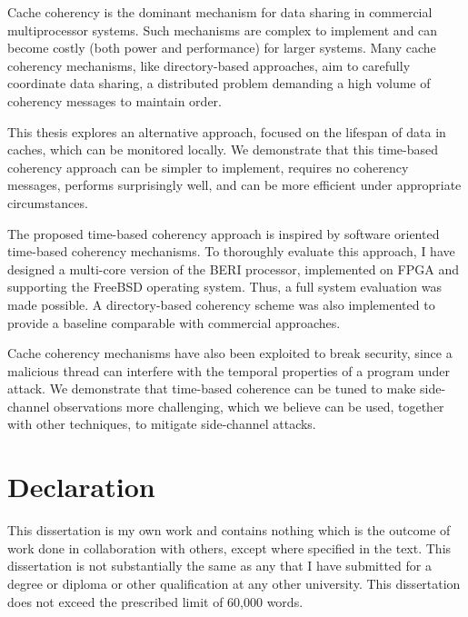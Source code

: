 \documentclass[twoside,openright,12pt]{Classes/CUEDthesisPSnPDF}
\begin{document}
\patchcmd{\abstract}{\null\vfil}{}{}{}
\begin{abstractseparate}
Cache coherency is the dominant mechanism for data sharing in commercial multiprocessor systems. Such mechanisms are complex to implement and can become costly (both power and performance) for larger systems.  Many cache coherency mechanisms, like directory-based approaches, aim to carefully coordinate data sharing, a distributed problem demanding a high volume of coherency messages to maintain order. 

This thesis explores an alternative approach, focused on the lifespan of data in caches, which can be monitored locally.  We demonstrate that this time-based coherency approach can be simpler to implement, requires no coherency messages, performs surprisingly well, and can be more efficient under appropriate circumstances.

The proposed time-based coherency approach is inspired by software oriented time-based coherency mechanisms. %
To thoroughly evaluate this approach, I have designed a multi-core version of the BERI processor, implemented on FPGA and supporting the FreeBSD operating system. Thus, a full system evaluation was made possible. A directory-based coherency scheme was also implemented to provide a baseline comparable with commercial approaches.

Cache coherency mechanisms have also been exploited to break security, since a malicious thread can interfere with the temporal properties of a program under attack. We demonstrate that time-based coherence can be tuned to make side-channel observations more challenging, which we believe can be used, together with other techniques, to mitigate side-channel attacks.
\end{abstractseparate}


\clearpage
\thispagestyle{empty}
\mbox{}

\chapter*{Declaration}
\thispagestyle{empty}
This dissertation is my own work and contains nothing which is the outcome of
work done in collaboration with others, except where specified in the text. This
dissertation is not substantially the same as any that I have submitted for a
degree or diploma or other qualification at any other university. This
dissertation does not exceed the prescribed limit of 60,000 words.
\end{document}
